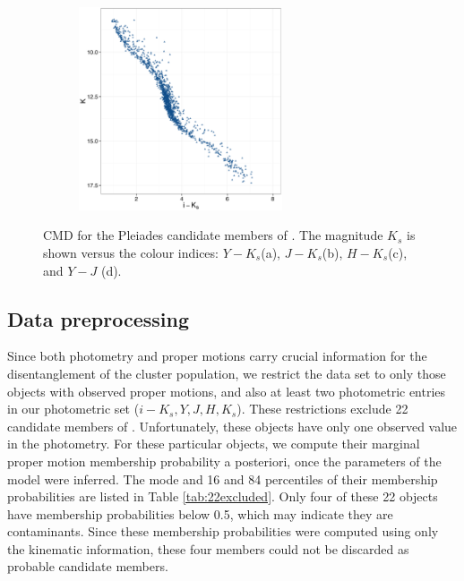 \begin{figure}[ht!]
\begin{subfigure}[t]{0.45\textwidth}
      \includegraphics[page=5,height=6cm]{background/Figures/CIs.pdf}
        \caption{}
        \label{} 
    \end{subfigure}
    \caption{CMD for the Pleiades candidate members of \citet{Bouy2015}. The magnitude $K_s$ is shown versus the colour indices: $Y-K_s$(a), $J-K_s$(b), $H-K_s$(c), and $Y-J$ (d).}
    \label{fig:otherCI}
\end{figure}


\subsection{Data preprocessing}
\label{sect:RDR2}
Since both photometry and proper motions carry crucial information for the disentanglement of the cluster population, we restrict the data set to only those objects with observed proper motions, and also at least two photometric entries in our photometric set ($i-K_s,Y,J,H,K_s$). These restrictions exclude 22 candidate members of \citet{Bouy2015}. Unfortunately, these objects have only one observed value in the photometry. For these particular objects, we compute their marginal proper motion membership probability a posteriori, once the parameters of the model were inferred. The mode and 16 and 84 percentiles of their membership probabilities are listed in Table \ref{tab:22excluded}. Only four of these 22 objects have membership probabilities below 0.5, which may indicate they are contaminants. Since these membership probabilities were computed using only the kinematic information, these four members could not be discarded as probable candidate members.

